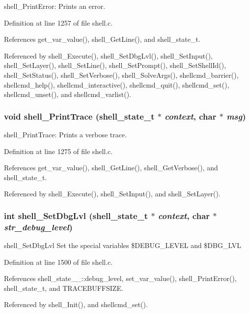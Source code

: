shell\_\-Print\-Error: Prints an error. 

Definition at line 1257 of file shell.c.

References get\_\-var\_\-value(), shell\_\-Get\-Line(), and shell\_\-state\_\-t.

Referenced by shell\_\-Execute(), shell\_\-Set\-Dbg\-Lvl(), shell\_\-Set\-Input(), shell\_\-Set\-Layer(), shell\_\-Set\-Line(), shell\_\-Set\-Prompt(), shell\_\-Set\-Shell\-Id(), shell\_\-Set\-Status(), shell\_\-Set\-Verbose(), shell\_\-Solve\-Args(), shellcmd\_\-barrier(), shellcmd\_\-help(), shellcmd\_\-interactive(), shellcmd\_\-quit(), shellcmd\_\-set(), shellcmd\_\-unset(), and shellcmd\_\-varlist().
\subsubsection{\setlength{\rightskip}{0pt plus 5cm}void shell\_\-Print\-Trace ({\bf shell\_\-state\_\-t} $\ast$ {\em context}, char $\ast$ {\em msg})}\label{shell_8c_a28}


shell\_\-Print\-Trace: Prints a verbose trace. 

Definition at line 1275 of file shell.c.

References get\_\-var\_\-value(), shell\_\-Get\-Line(), shell\_\-Get\-Verbose(), and shell\_\-state\_\-t.

Referenced by shell\_\-Execute(), shell\_\-Set\-Input(), and shell\_\-Set\-Layer().
\subsubsection{\setlength{\rightskip}{0pt plus 5cm}int shell\_\-Set\-Dbg\-Lvl ({\bf shell\_\-state\_\-t} $\ast$ {\em context}, char $\ast$ {\em str\_\-debug\_\-level})}\label{shell_8c_a35}


shell\_\-Set\-Dbg\-Lvl Set the special variables \$DEBUG\_\-LEVEL and \$DBG\_\-LVL 

Definition at line 1500 of file shell.c.

References shell\_\-state\_\-\_\-::debug\_\-level, set\_\-var\_\-value(), shell\_\-Print\-Error(), shell\_\-state\_\-t, and TRACEBUFFSIZE.

Referenced by shell\_\-Init(), and shellcmd\_\-set().
